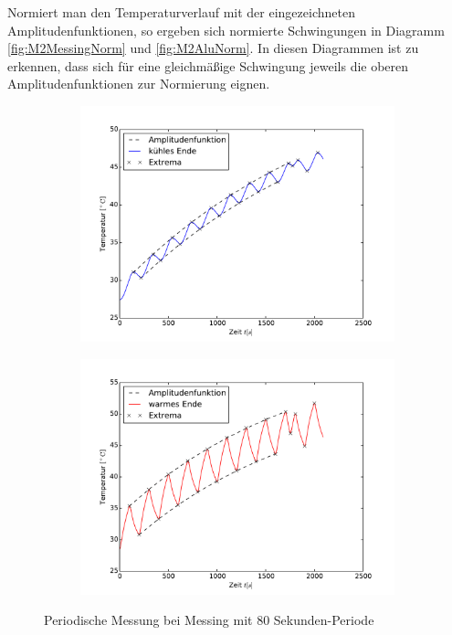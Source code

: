 Normiert man den Temperaturverlauf mit der eingezeichneten Amplitudenfunktionen, so ergeben sich normierte Schwingungen in Diagramm \ref{fig:M2MessingNorm} und \ref{fig:M2AluNorm}. In diesen Diagrammen ist zu erkennen, dass sich für eine gleichmäßige Schwingung jeweils die oberen Amplitudenfunktionen zur Normierung eignen.

\begin{figure}[htp]
\label{fig:M2Messing}
\centering
	\begin{subfigure}{0.9\textwidth}
	\includegraphics[width=\textwidth]{Bilder/M2_Messing_kuehl.pdf}
	\end{subfigure}
	\begin{subfigure}{0.9\textwidth}
	\includegraphics[width=\textwidth]{Bilder/M2_Messing_warm.pdf}
	\end{subfigure}
\caption{Periodische Messung bei Messing mit 80 Sekunden-Periode}
\end{figure}
